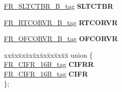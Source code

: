 \begin{DoxyCompactItemize}
\mbox{\hyperlink{unionFR__SLTCTBR__16B__tag}{F\+R\+\_\+\+S\+L\+T\+C\+T\+B\+R\+\_\+B\+\_\+tag}} {\bfseries S\+L\+T\+C\+T\+BR}
\item 
\mbox{\label{structFR__struct__tag_af463d83cc8af3da949f032b375d0a79b}} 
\mbox{\hyperlink{unionFR__RTCORVR__16B__tag}{F\+R\+\_\+\+R\+T\+C\+O\+R\+V\+R\+\_\+B\+\_\+tag}} {\bfseries R\+T\+C\+O\+R\+VR}
\item 
\mbox{\label{structFR__struct__tag_a3646e66d1182716702edf8510e05771d}} 
\mbox{\hyperlink{unionFR__OFCORVR__16B__tag}{F\+R\+\_\+\+O\+F\+C\+O\+R\+V\+R\+\_\+B\+\_\+tag}} {\bfseries O\+F\+C\+O\+R\+VR}
\item 
\mbox{\label{structFR__struct__tag_abb92e2052652ba05d6cb8765746330ff}} 
\begin{tabbing}
xx\=xx\=xx\=xx\=xx\=xx\=xx\=xx\=xx\=\kill
union \{\\
\>\mbox{\hyperlink{unionFR__CIFR__16B__tag}{FR\_CIFR\_16B\_tag}} {\bfseries CIFRR}\\
\>\mbox{\hyperlink{unionFR__CIFR__16B__tag}{FR\_CIFR\_16B\_tag}} {\bfseries CIFR}\\
\}; \\


\end{tabbing}
\end{DoxyCompactItemize}
